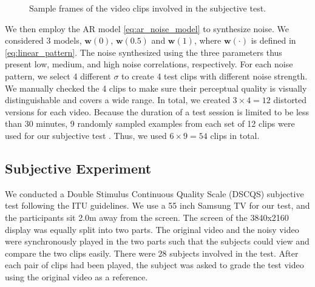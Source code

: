 \documentclass{sig-alternate}
\begin{document}
\begin{figure}[!h]
{}
\caption[Optional caption for list of figures]{
Sample frames of the video clips involved in the subjective test.
}
\label{fig:sampleframe}
\end{figure}

We then employ the AR model \eqref{eq:ar_noise_model} to synthesize noise. We considered 3 models, $\mathbf{w}(0)$, $\mathbf{w}(0.5)$ and $\mathbf{w}(1)$, where $\mathbf{w}(\cdot)$ is defined in \eqref{eq:linear_pattern}. The noise synthesized using the three parameters thus present low, medium, and high noise correlations, respectively. For each noise pattern, we select 4 different $\sigma$ to create 4 test clips with different noise strength. We manually checked the 4 clips to make sure their perceptual quality is visually distinguishable and covers a wide range. In total, we created $3\times4=12$ distorted versions for each video. Because the duration of a test session is limited to be less than 30 minutes, 9 randomly sampled examples from each set of 12 clips were used for our subjective test \cite{ITU}. Thus, we used $6\times9=54$ clips in total.
\subsection{Subjective Experiment}
\label{sec:subjective_study}
We conducted a Double Stimulus Continuous Quality Scale (DSCQS) subjective test following the ITU guidelines\cite{ITU}. We use a 55 inch Samsung TV for our test, and the participants sit 2.0m away from the screen. 
The screen of the 3840x2160 display was equally split into two parts. The original video and the noisy video were synchronously played in the two parts such that the subjects could view and compare the two clips easily. There were 28 subjects involved in the test. After each pair of clips had been played, the subject was asked to grade the test video using the original video as a reference.
\end{document}
